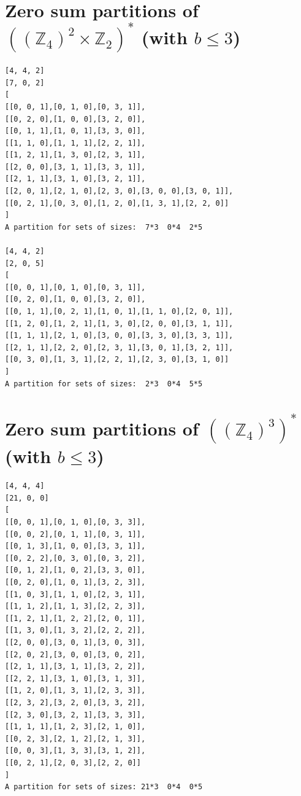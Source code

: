 \documentclass[final]{dmtcs-episciences}
\newcommand{\zet}{\mathbb{Z}}
\begin{document}
\begin{appendices}
\section{\texorpdfstring{Zero sum partitions of $\left((\zet_4)^{2}\times\zet_2\right)^*$ (with $b\leq 3$)}{Zero sum partitions of ((Z4)**2 x Z2)* (with b <= 3)}}\label{a:442}
\begin{verbatim}
[4, 4, 2]
[7, 0, 2]
[
[[0, 0, 1],[0, 1, 0],[0, 3, 1]],
[[0, 2, 0],[1, 0, 0],[3, 2, 0]],
[[0, 1, 1],[1, 0, 1],[3, 3, 0]],
[[1, 1, 0],[1, 1, 1],[2, 2, 1]],
[[1, 2, 1],[1, 3, 0],[2, 3, 1]],
[[2, 0, 0],[3, 1, 1],[3, 3, 1]],
[[2, 1, 1],[3, 1, 0],[3, 2, 1]],
[[2, 0, 1],[2, 1, 0],[2, 3, 0],[3, 0, 0],[3, 0, 1]],
[[0, 2, 1],[0, 3, 0],[1, 2, 0],[1, 3, 1],[2, 2, 0]]
]
A partition for sets of sizes:  7*3  0*4  2*5

[4, 4, 2]
[2, 0, 5]
[
[[0, 0, 1],[0, 1, 0],[0, 3, 1]],
[[0, 2, 0],[1, 0, 0],[3, 2, 0]],
[[0, 1, 1],[0, 2, 1],[1, 0, 1],[1, 1, 0],[2, 0, 1]],
[[1, 2, 0],[1, 2, 1],[1, 3, 0],[2, 0, 0],[3, 1, 1]],
[[1, 1, 1],[2, 1, 0],[3, 0, 0],[3, 3, 0],[3, 3, 1]],
[[2, 1, 1],[2, 2, 0],[2, 3, 1],[3, 0, 1],[3, 2, 1]],
[[0, 3, 0],[1, 3, 1],[2, 2, 1],[2, 3, 0],[3, 1, 0]]
]
A partition for sets of sizes:  2*3  0*4  5*5
\end{verbatim}

\newpage
\section{\texorpdfstring{Zero sum partitions of $\left((\zet_4)^{3}\right)^*$ (with $b\leq 3$)}{Zero sum partitions of ((Z4)**3)* (with b <= 3)}}\label{a:444}
\begin{verbatim}
[4, 4, 4]
[21, 0, 0]
[
[[0, 0, 1],[0, 1, 0],[0, 3, 3]],
[[0, 0, 2],[0, 1, 1],[0, 3, 1]],
[[0, 1, 3],[1, 0, 0],[3, 3, 1]],
[[0, 2, 2],[0, 3, 0],[0, 3, 2]],
[[0, 1, 2],[1, 0, 2],[3, 3, 0]],
[[0, 2, 0],[1, 0, 1],[3, 2, 3]],
[[1, 0, 3],[1, 1, 0],[2, 3, 1]],
[[1, 1, 2],[1, 1, 3],[2, 2, 3]],
[[1, 2, 1],[1, 2, 2],[2, 0, 1]],
[[1, 3, 0],[1, 3, 2],[2, 2, 2]],
[[2, 0, 0],[3, 0, 1],[3, 0, 3]],
[[2, 0, 2],[3, 0, 0],[3, 0, 2]],
[[2, 1, 1],[3, 1, 1],[3, 2, 2]],
[[2, 2, 1],[3, 1, 0],[3, 1, 3]],
[[1, 2, 0],[1, 3, 1],[2, 3, 3]],
[[2, 3, 2],[3, 2, 0],[3, 3, 2]],
[[2, 3, 0],[3, 2, 1],[3, 3, 3]],
[[1, 1, 1],[1, 2, 3],[2, 1, 0]],
[[0, 2, 3],[2, 1, 2],[2, 1, 3]],
[[0, 0, 3],[1, 3, 3],[3, 1, 2]],
[[0, 2, 1],[2, 0, 3],[2, 2, 0]]
]
A partition for sets of sizes: 21*3  0*4  0*5


\end{verbatim}
\end{appendices}
\end{document}
